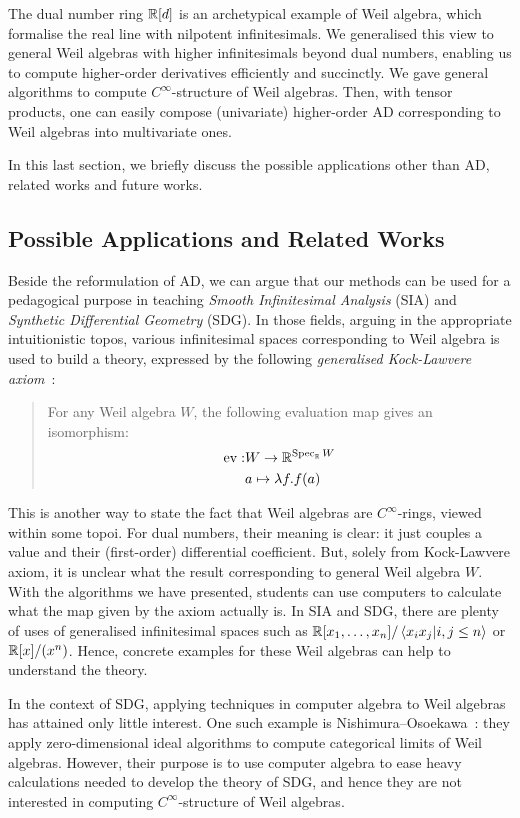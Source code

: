\documentclass[%
  sigconf,authorversion,screen]{acmart}
\begin{document}
The dual number ring $\mathbb{R}[d]$ is an archetypical example of Weil algebra, which formalise the real line with nilpotent infinitesimals.
We generalised this view to general Weil algebras with higher infinitesimals beyond dual numbers, enabling us to compute higher-order derivatives efficiently and succinctly.
We gave general algorithms to compute $C^\infty$-structure of Weil algebras.
Then, with tensor products, one can easily compose (univariate) higher-order AD corresponding to Weil algebras into multivariate ones.

In this last section, we briefly discuss the possible applications other than AD, related works and future works.

\subsection{Possible Applications and Related Works}
Beside the reformulation of AD, we can argue that our methods can be used for a pedagogical purpose in teaching \emph{Smooth Infinitesimal Analysis} (SIA) and \emph{Synthetic Differential Geometry} (SDG).
In those fields, arguing in the appropriate intuitionistic topos, various infinitesimal spaces corresponding to Weil algebra is used to build a theory, expressed by the following \emph{generalised Kock-Lawvere axiom}~\cite{Moerdijk:1991aa}:

\begin{quote}
  For any Weil algebra $W$, the following evaluation map gives an isomorphism:
  \begin{align*}
    \mathop{\mathrm{ev}}: &W \to   \mathbb{R}^{\mathop{\mathrm{Spec}}_{\mathbb{R}}{W}}\\
       &a \mapsto \lambda f. f(a)
  \end{align*}
\end{quote}
This is another way to state the fact that Weil algebras are $C^\infty$-rings, viewed within some topoi.
For dual numbers, their meaning is clear: it just couples a value and their (first-order) differential coefficient.
But, solely from Kock-Lawvere axiom, it is unclear what the result corresponding to general Weil algebra $W$.
With the algorithms we have presented, students can use computers to calculate what the map given by the axiom actually is.
In SIA and SDG, there are plenty of uses of generalised infinitesimal spaces such as $\mathbb{R}[x_1,\dots, x_n]/\braket{x_i x_j | i, j \leq n}$ or $\mathbb{R}[x]/(x^n)$.
Hence, concrete examples for these Weil algebras can help to understand the theory.

In the context of SDG, applying techniques in computer algebra to Weil algebras has attained only little interest.
One such example is Nishimura--Osoekawa~\cite{Nishimura:2007aa}: they apply zero-dimensional ideal algorithms to compute categorical limits of Weil algebras.
However, their purpose is to use computer algebra to ease heavy calculations needed to develop the theory of SDG, and hence they are not interested in computing $C^\infty$-structure of Weil algebras.
\end{document}
